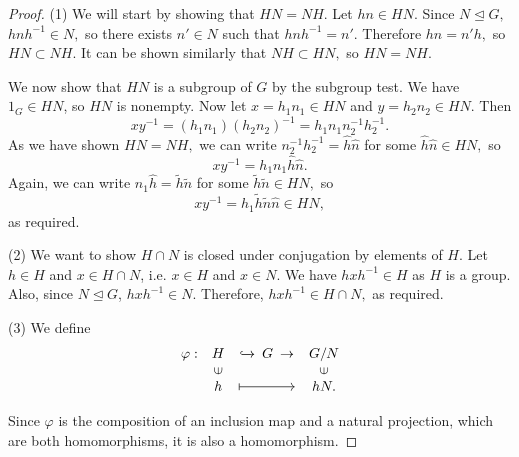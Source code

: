\begin{proof}

    
    (1) We will start by showing that $HN=NH.$ Let $hn\in HN.$ Since $N\trianglelefteq G,$ $hnh^{-1}\in N,$ so there exists $n'\in N$ such that $hnh^{-1}=n'.$ Therefore $hn=n'h,$ so $HN\subset NH.$ It can be shown similarly that $NH\subset HN,$ so $HN=NH.$ 
    
    We now show that $HN$ is a subgroup of $G$ by the subgroup test.
    We have $1_G\in HN$, so $HN$ is nonempty.
    Now let $x=h_1n_1\in HN$ and $y=h_2n_2\in HN.$ Then
    $$xy^{-1} = (h_1n_1)(h_2n_2)^{-1} = h_1 n_1 n_2^{-1} h_2^{-1}.$$ As we have shown $HN=NH,$ we can write $n_2^{-1} h_2^{-1}=\hat{h}\hat{n}$ for some $\hat{h}\hat{n} \in HN,$ so $$xy^{-1}=h_1 n_1\hat{h}\hat{n}.$$ Again, we can write $n_1\hat{h}=\tilde{h}\tilde{n}$ for some $\tilde{h}\tilde{n}\in HN,$ so $$xy^{-1}=h_1\tilde{h}\tilde{n}\hat{n}\in HN,$$ as required.

    (2) We want to show $H\cap N$ is closed under conjugation by elements of $H.$ Let $h \in H$ and $x \in H \cap N$, i.e. $x\in H$ and $x\in N$. We have $hxh^{-1}\in H$ as $H$ is a group. Also, since $N \trianglelefteq G$, $hxh^{-1} \in N$. Therefore, $hxh^{-1}\in H\cap N,$ as required.

    (3) We define 
    \[
    \begin{array}{cccccc}
         \varphi: & H & \xhookrightarrow{} \: G \: \to & G/N \\
         & \vin & & \vin \\
         & h & \longlonglongmapsto & hN.
    \end{array}
    \]
    
    Since $\varphi$ is the composition of an inclusion map and a natural projection, which are both homomorphisms, it is also a homomorphism.
    

\end{proof}
